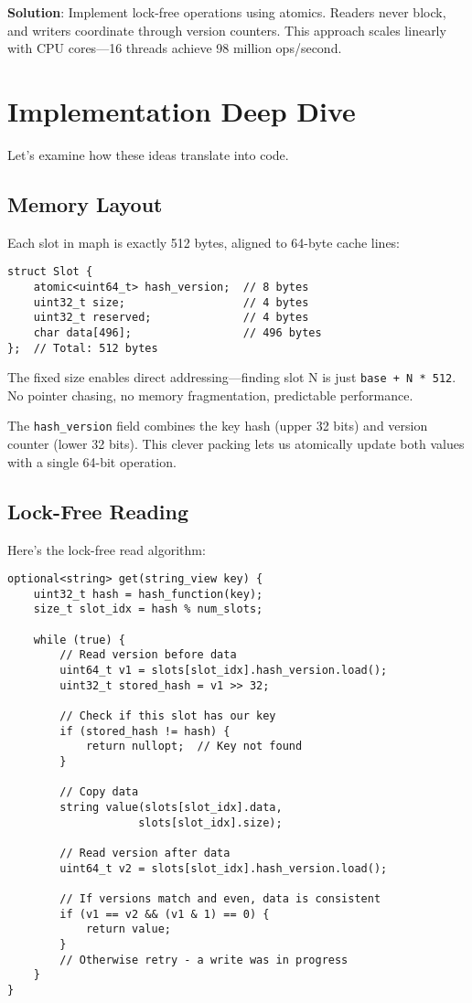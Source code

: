 \documentclass[11pt]{article}
\begin{document}
\textbf{Solution}: Implement lock-free operations using atomics. Readers never block, and writers coordinate through version counters. This approach scales linearly with CPU cores—16 threads achieve 98 million ops/second.

\section{Implementation Deep Dive}

Let's examine how these ideas translate into code.

\subsection{Memory Layout}

Each slot in maph is exactly 512 bytes, aligned to 64-byte cache lines:

\begin{lstlisting}
struct Slot {
    atomic<uint64_t> hash_version;  // 8 bytes
    uint32_t size;                  // 4 bytes  
    uint32_t reserved;              // 4 bytes
    char data[496];                 // 496 bytes
};  // Total: 512 bytes
\end{lstlisting}

The fixed size enables direct addressing—finding slot N is just \texttt{base + N * 512}. No pointer chasing, no memory fragmentation, predictable performance.

The \texttt{hash\_version} field combines the key hash (upper 32 bits) and version counter (lower 32 bits). This clever packing lets us atomically update both values with a single 64-bit operation.

\subsection{Lock-Free Reading}

Here's the lock-free read algorithm:

\begin{lstlisting}
optional<string> get(string_view key) {
    uint32_t hash = hash_function(key);
    size_t slot_idx = hash % num_slots;
    
    while (true) {
        // Read version before data
        uint64_t v1 = slots[slot_idx].hash_version.load();
        uint32_t stored_hash = v1 >> 32;
        
        // Check if this slot has our key
        if (stored_hash != hash) {
            return nullopt;  // Key not found
        }
        
        // Copy data
        string value(slots[slot_idx].data, 
                    slots[slot_idx].size);
        
        // Read version after data  
        uint64_t v2 = slots[slot_idx].hash_version.load();
        
        // If versions match and even, data is consistent
        if (v1 == v2 && (v1 & 1) == 0) {
            return value;
        }
        // Otherwise retry - a write was in progress
    }
}
\end{lstlisting}
\end{document}
